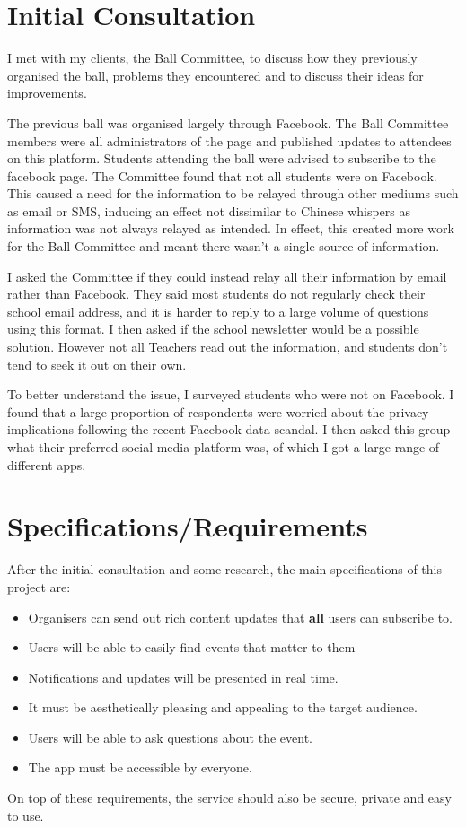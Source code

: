 \documentclass[a4paper,oneside,12pt]{report}
\begin{document}
	\section{Initial Consultation}
	I met with my clients, the Ball Committee, to discuss how they previously organised the ball, problems they encountered and to discuss their ideas for improvements.

    The previous ball was organised largely through Facebook. The Ball Committee members were all administrators of the page and published updates to attendees on this platform. Students attending the ball were advised to subscribe to the facebook page. The Committee found that not all students were on Facebook. This caused a need for the information to be relayed through other mediums such as email or SMS, inducing an effect not dissimilar to Chinese whispers as information was not always relayed as intended. In effect, this created more work for the Ball Committee and meant there wasn't a single source of information.

    I asked the Committee if they could instead relay all their information by email rather than Facebook. They said most students do not regularly check their school email address, and it is harder to reply to a large volume of questions using this format. I then asked if the school newsletter would be a possible solution. However not all Teachers read out the information, and students don't tend to seek it out on their own.

    To better understand the issue, I surveyed students who were not on Facebook. I found that a large proportion of respondents were worried about the privacy implications following the recent Facebook data scandal. I then asked this group what their preferred social media platform was, of which I got a large range of different apps.

	\section{Specifications/Requirements}
	After the initial consultation and some research, the main specifications of this project are:
	\begin{itemize}
		\item Organisers can send out rich content updates that \textbf{all} users can subscribe to.
		\item Users will be able to easily find events that matter to them
		\item Notifications and updates will be presented in real time.
		\item It must be aesthetically pleasing and appealing to the target audience.
		\item Users will be able to ask questions about the event.
		\item The app must be accessible by everyone.
	\end{itemize}
	On top of these requirements, the service should also be secure, private and easy to use.
\end{document}
